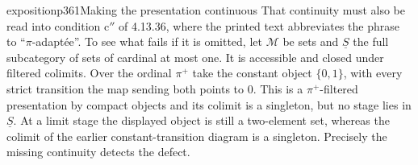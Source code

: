 \begin{dcomment}{exposition}{p361}{Making the presentation continuous}
That continuity must also be read into condition c$''$ of 4.13.36, where the printed text abbreviates the phrase to ``$\pi$-adaptée''. To see what fails if it is omitted, let $\mathcal M$ be sets and $\underline S$ the full subcategory of sets of cardinal at most one. It is accessible and closed under filtered colimits. Over the ordinal $\pi^+$ take the constant object $\{0,1\}$, with every strict transition the map sending both points to $0$. This is a $\pi^+$-filtered presentation by compact objects and its colimit is a singleton, but no stage lies in $\underline S$. At a limit stage the displayed object is still a two-element set, whereas the colimit of the earlier constant-transition diagram is a singleton. Precisely the missing continuity detects the defect.
\end{dcomment}

